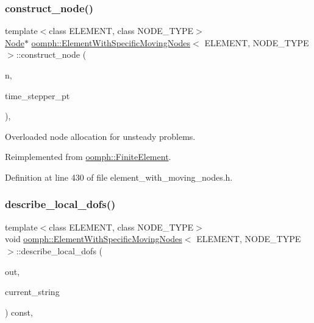 \subsubsection{\texorpdfstring{construct\+\_\+node()}{construct\_node()}\hspace{0.1cm}{\footnotesize\ttfamily [2/2]}}
{\footnotesize\ttfamily template$<$class E\+L\+E\+M\+E\+NT, class N\+O\+D\+E\+\_\+\+T\+Y\+PE$>$ \\
\hyperlink{classoomph_1_1Node}{Node}$\ast$ \hyperlink{classoomph_1_1ElementWithSpecificMovingNodes}{oomph\+::\+Element\+With\+Specific\+Moving\+Nodes}$<$ E\+L\+E\+M\+E\+NT, N\+O\+D\+E\+\_\+\+T\+Y\+PE $>$\+::construct\+\_\+node (\begin{DoxyParamCaption}\item[{const unsigned \&}]{n,  }\item[{\hyperlink{classoomph_1_1TimeStepper}{Time\+Stepper} $\ast$const \&}]{time\+\_\+stepper\+\_\+pt }\end{DoxyParamCaption})\hspace{0.3cm}{\ttfamily [inline]}, {\ttfamily [virtual]}}



Overloaded node allocation for unsteady problems. 



Reimplemented from \hyperlink{classoomph_1_1FiniteElement_ab340a73573761cfceb22b2fca985026a}{oomph\+::\+Finite\+Element}.



Definition at line 430 of file element\+\_\+with\+\_\+moving\+\_\+nodes.\+h.

\mbox{\label{classoomph_1_1ElementWithSpecificMovingNodes_abbcb617eac0cb1d5763fae6ff81cb154}} 
\subsubsection{\texorpdfstring{describe\+\_\+local\+\_\+dofs()}{describe\_local\_dofs()}\hspace{0.1cm}{\footnotesize\ttfamily [1/2]}}
{\footnotesize\ttfamily template$<$class E\+L\+E\+M\+E\+NT, class N\+O\+D\+E\+\_\+\+T\+Y\+PE$>$ \\
void \hyperlink{classoomph_1_1ElementWithSpecificMovingNodes}{oomph\+::\+Element\+With\+Specific\+Moving\+Nodes}$<$ E\+L\+E\+M\+E\+NT, N\+O\+D\+E\+\_\+\+T\+Y\+PE $>$\+::describe\+\_\+local\+\_\+dofs (\begin{DoxyParamCaption}\item[{std\+::ostream \&}]{out,  }\item[{const std\+::string \&}]{current\+\_\+string }\end{DoxyParamCaption}) const\hspace{0.3cm}{\ttfamily [inline]}, {\ttfamily [virtual]}}



